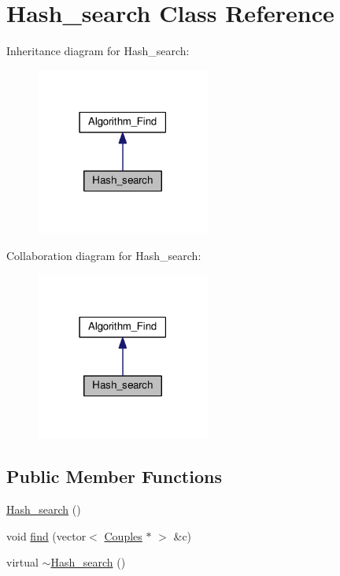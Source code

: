 \hypertarget{class_hash__search}{\section{Hash\-\_\-search Class Reference}
\label{class_hash__search}
}


Inheritance diagram for Hash\-\_\-search\-:
\nopagebreak
\begin{figure}[H]
\begin{center}
\leavevmode
\includegraphics[width=162pt]{class_hash__search__inherit__graph}
\end{center}
\end{figure}


Collaboration diagram for Hash\-\_\-search\-:
\nopagebreak
\begin{figure}[H]
\begin{center}
\leavevmode
\includegraphics[width=162pt]{class_hash__search__coll__graph}
\end{center}
\end{figure}
\subsection*{Public Member Functions}
\begin{DoxyCompactItemize}
\item 
\hyperlink{class_hash__search_acffeccf3054374944def64decaebadaa}{Hash\-\_\-search} ()
\item 
void \hyperlink{class_hash__search_aca6c6feb173e26bf7d1aa574e3c9316c}{find} (vector$<$ \hyperlink{class_couples}{Couples} $\ast$ $>$ \&c)
\item 
virtual \hyperlink{class_hash__search_ae9a29812abacc5f48902676f2073c61e}{$\sim$\-Hash\-\_\-search} ()
\end{DoxyCompactItemize}


